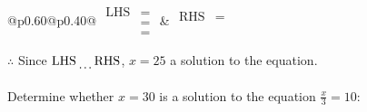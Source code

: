 \documentclass[12pt]{article}
\newcounter{minipagecount}
\begin{document}
\begin{multicols}{2}
\begin{minipage}[t]{0.40\textwidth}
    \noindent
    \renewcommand{\arraystretch}{1.3} %
    \begin{tabular}{@{}p{0.60\linewidth}@{}p{0.40\linewidth}@{}}
        \(\begin{aligned}
            \text{LHS} &=  \\
                    &=  \\
                    &= 
        \end{aligned}\) &
        \(\begin{aligned}
            \text{RHS} &= \\
                    & \\
                    &
        \end{aligned}\)
    \end{tabular}
    \renewcommand{\arraystretch}{1.0} %
    \vspace{2pt}  %

    \noindent \(\therefore\) Since \(\text{LHS} \dotuline{\hspace{5mm}} \text{RHS}\), \(x = 25\) \dotuline{\hspace{12mm}} a solution to the equation.

\end{minipage}

\vspace*{0.5ex}
\vfill{}
\noindent{(\theminipagecount)}\hspace{0.1mm} %
\begin{minipage}[t]{0.40\textwidth} %

    \noindent Determine whether \(x = 30\) is a solution to the equation \(\frac{x}{3} = 10\):
    \vspace{2pt}  %


\end{minipage}
\end{multicols}
\end{document}
